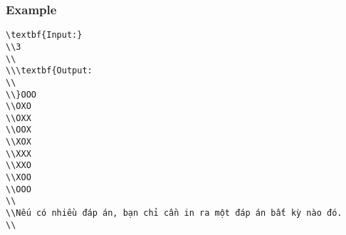 \subsubsection{   Example  }
\begin{verbatim}
\textbf{Input:}
\\3
\\
\\\textbf{Output:
\\
\\}OOO
\\OXO
\\OXX
\\OOX
\\XOX
\\XXX
\\XXO
\\XOO
\\OOO
\\
\\Nếu có nhiều đáp án, bạn chỉ cần in ra một đáp án bất kỳ nào đó.
\\\end{verbatim}
